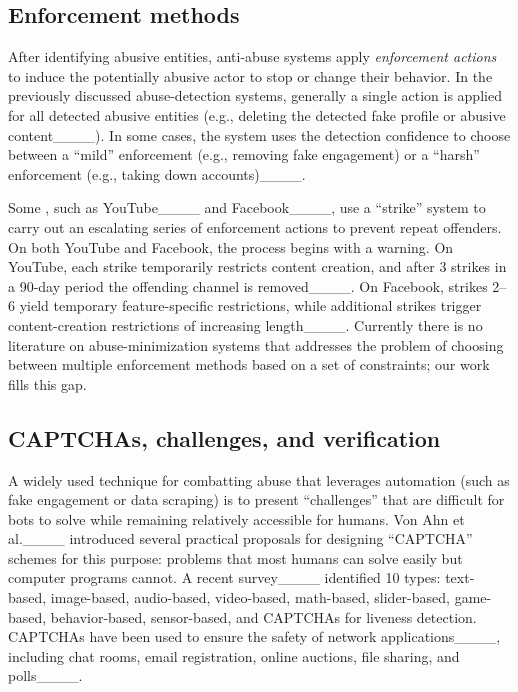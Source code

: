 \subsection{Enforcement methods}\label{sec:bg_enforcements}

After identifying abusive entities, anti-abuse systems apply {\em enforcement actions} to induce the potentially abusive actor to stop or change their behavior. In the previously discussed abuse-detection systems, generally a single action is applied for all detected abusive entities (e.g., deleting the detected fake profile or abusive content____). In some cases, the system uses the detection confidence to choose between a ``mild'' enforcement (e.g., removing fake engagement) or a ``harsh'' enforcement (e.g., taking down accounts)____.

Some \osns, such as YouTube____ and Facebook____, use a ``strike'' system to carry out an escalating series of enforcement actions to prevent repeat offenders. On both YouTube and Facebook, the process begins with a warning. On YouTube, each strike temporarily restricts content creation, and after 3 strikes in a 90-day period the offending channel is removed____.
On Facebook, strikes 2--6 yield temporary feature-specific restrictions, while additional strikes trigger content-creation restrictions of increasing length____. 
Currently there is no literature on abuse-minimization systems that addresses the problem of choosing between multiple enforcement methods based on a set of constraints; our work fills this gap.

\subsection{CAPTCHAs, challenges, and verification}

A widely used technique for combatting abuse that leverages automation (such as fake engagement or data scraping) is to present ``challenges'' that are difficult for bots to solve while remaining relatively accessible for humans. Von Ahn et al.____ introduced several practical proposals for designing ``CAPTCHA'' schemes for this purpose: problems that most humans can solve easily but computer programs cannot. A recent survey____ identified 10 types: text-based, image-based, audio-based, video-based, math-based, slider-based, game-based, behavior-based, sensor-based, and CAPTCHAs for liveness detection. CAPTCHAs have been used to ensure the safety of network applications____, including chat rooms, email registration, online auctions, file sharing, and polls____.

